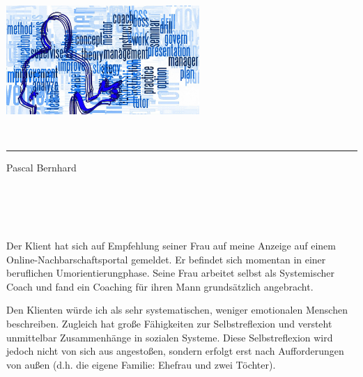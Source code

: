 \documentclass[11pt,a4paper]{article}
\begin{document}
\sffamily   %
\hfill%
\begin{minipage}[t]{.6\textwidth}
\raggedleft%
\includegraphics[width=0.55\textwidth]{Coaching-Logo_1280-720.jpg}


\end{minipage}\\[0.5em]
%
{\color{firstnamecolor}\rule{\textwidth}{.25ex}}
%
\begin{minipage}[t]{.4\textwidth}
	\raggedright%
	\vspace*{1em}

	\small%
\end{minipage}
%
\hfill
%
\begin{minipage}[t]{.4\textwidth}
	\raggedleft %
	Pascal Bernhard
\end{minipage}\\[2.2em]


{\bfseries {}}\\[0.75em]

\section*{\color{MidnightBlue}{Rahmeninformationen zum Klienten}}


Der Klient hat sich auf Empfehlung seiner Frau auf meine Anzeige auf einem Online-Nachbarschaftsportal gemeldet. Er befindet sich momentan in einer beruflichen Umorientierungphase. Seine Frau arbeitet selbst als Systemischer Coach und fand ein Coaching für ihren Mann grundsätzlich angebracht.

Den Klienten würde ich als sehr systematischen, weniger emotionalen Menschen beschreiben. Zugleich hat große Fähigkeiten zur Selbstreflexion und versteht unmittelbar Zusammenhänge in sozialen Systeme. Diese Selbstreflexion wird jedoch nicht von sich aus angestoßen, sondern erfolgt erst nach Aufforderungen von außen (d.h. die eigene Familie: Ehefrau und zwei Töchter).
\end{document}
